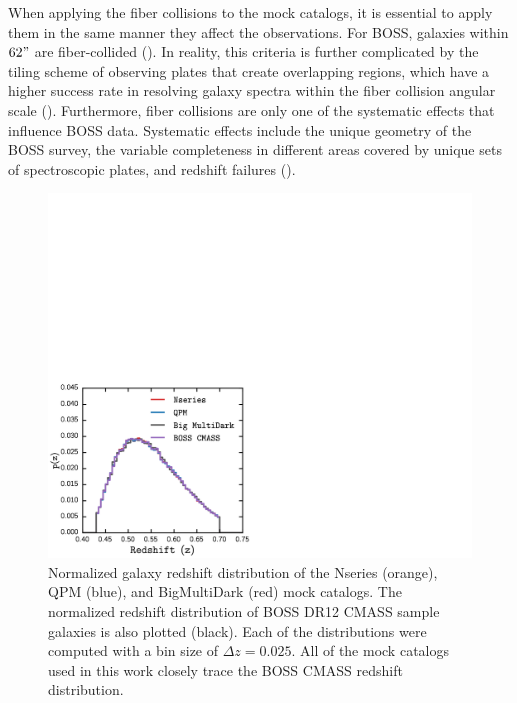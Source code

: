When applying the fiber collisions to the mock catalogs, it is essential to 
apply them in the same manner they affect the observations. For BOSS, galaxies
within $62"$ are fiber-collided (\citealt{Anderson:2012aa}). In reality, 
this criteria is further complicated by the tiling scheme of observing 
plates that create overlapping regions, which have a higher success rate in 
resolving galaxy spectra within the fiber collision angular scale (\citealt{
Guo:2012aa, Reid:2012aa}). Furthermore, fiber collisions are only one of the 
systematic effects that influence BOSS data. Systematic effects include the 
unique geometry of the BOSS survey, the variable completeness in different areas  
covered by unique sets of spectroscopic plates, and redshift failures 
(\citealt{Anderson:2012aa, Ross:2012aa}). 

\def \cmasscolor{black}
\def \ldgcolor{blue}
\def \nseriescolor{orange}
\def \qpmcolor{blue}
\def \tmcolor{green}
\def \bmdcolor{red}

\begin{figure}
\begin{center}
\includegraphics[scale=0.425]{figs/fc/mock_catalog_z_dist.pdf} 
\caption{Normalized galaxy redshift distribution of the Nseries (\nseriescolor), 
QPM (\qpmcolor), and BigMultiDark (\bmdcolor) mock catalogs. The 
normalized redshift distribution of BOSS DR12 CMASS sample galaxies 
is also plotted (\cmasscolor). Each of the distributions were computed
with a bin size of $\Delta z = 0.025$. All of the mock catalogs used 
in this work closely trace the BOSS CMASS redshift distribution.}
\label{fig:zdist}
\end{center}
\end{figure}

